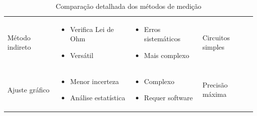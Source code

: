 \documentclass[12pt]{article}
\begin{document}
\begin{table}[H]
\begin{tabular}{@{}llll@{}}
        Método indireto & 
        \begin{minipage}[t]{0.2\textwidth}
            \begin{itemize}
                \item Verifica Lei de Ohm
                \item Versátil
            \end{itemize}
        \end{minipage} &
        \begin{minipage}[t]{0.25\textwidth}
            \begin{itemize}
                \item Erros sistemáticos
                \item Mais complexo
            \end{itemize}
        \end{minipage} &
        Circuitos simples \\
        
        Ajuste gráfico & 
        \begin{minipage}[t]{0.2\textwidth}
            \begin{itemize}
                \item Menor incerteza
                \item Análise estatística
            \end{itemize}
        \end{minipage} &
        \begin{minipage}[t]{0.25\textwidth}
            \begin{itemize}
                \item Complexo
                \item Requer software
            \end{itemize}
        \end{minipage} &
        Precisão máxima \\
        \bottomrule
    \end{tabular}
    \caption{Comparação detalhada dos métodos de medição}
\end{table}
\end{document}
